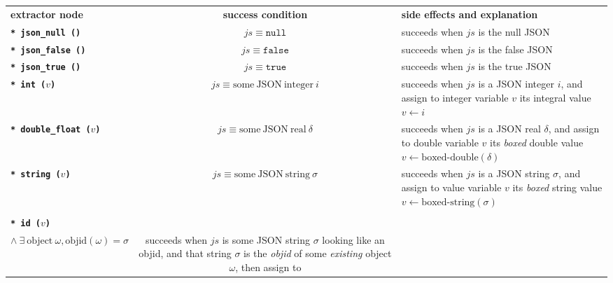 \begin{table}%
  \begin{relsize}{-1.2}
  \begin{center}
    \begin{tabular}{lcp{5.7cm}}
      \textbf{extractor node} & \hspace*{1cm} \textbf{success condition} \hspace*{1cm}  & \textbf{side effects and explanation} \\
      \texttt{\textbf{* json\_null ()}} &
      $\mathit{js} \equiv \mathtt{null}$ &
      succeeds when $\mathit{js}$ is the null JSON \\
      \texttt{\textbf{* json\_false ()}} &
      $\mathit{js} \equiv \mathtt{false}$ &
      succeeds when $\mathit{js}$ is the false JSON \\
      \texttt{\textbf{* json\_true ()}} &
      $\mathit{js} \equiv \mathtt{true}$ &
      succeeds when $\mathit{js}$ is the true JSON \\
      \texttt{\textbf{* int ($v$)}} &
      $\mathit{js} \equiv \mathrm{some ~ JSON ~ integer}~ i$ &
      succeeds when $\mathit{js}$ is a JSON integer $i$, and assign to integer
      variable $v$ its integral value $v \leftarrow i$\\
      \texttt{\textbf{* double\_float ($v$)}} &
      $\mathit{js} \equiv \mathrm{some ~ JSON ~ real}~ \delta$ &
      succeeds when $\mathit{js}$ is a JSON real $\delta$, and assign to double
      variable $v$ its \emph{boxed} double value $v \leftarrow
      \mathrm{\textrm{boxed-double}} (\delta)$\\
      \texttt{\textbf{* string ($v$)}} &
      $\mathit{js} \equiv \mathrm{some ~ JSON ~ string}~ \sigma$ &
      succeeds when $\mathit{js}$ is a JSON string $\sigma$, and assign to
      value variable $v$ its \emph{boxed} string value $v \leftarrow
      \mathrm{\textrm{boxed-string}} (\sigma)$ \\
            \rule{0pt}{1ex} \\
      \texttt{\textbf{* id ($v$)}} &
      \begin{minipage}[t]{4cm}
        $\mathit{js} \equiv \mathrm{some ~ JSON ~ string}~ \sigma$\\
        \hspace*{0.5em} $ \wedge ~ \exists ~ \mathrm{object} ~ \omega, \mathrm{objid}(\omega) = \sigma$ 
      \end{minipage}
      &
      succeeds when $\mathit{js}$ is some JSON string $\sigma$ looking like an objid, and that string $\sigma$ is the \emph{objid} of some \emph{existing} object $\omega$, then assign to

\end{tabular}
\end{center}
\end{relsize}
\end{table}
